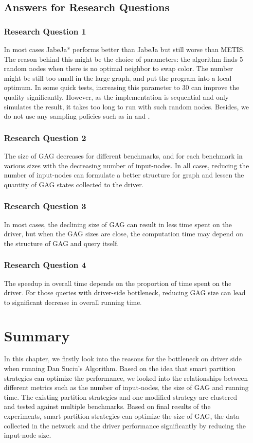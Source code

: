 \subsection{Answers for Research Questions}
\subsubsection{Research Question 1}
In most cases JabeJa* performs better than JabeJa but still worse than METIS. The reason behind this might be the choice of parameters: the algorithm finds 5 random nodes when there is no optimal neighbor to swap color.  The number might be still too small in the large graph, and put the program into a local optimum. In some quick tests, increasing this parameter to 30 can improve the quality significantly. However, as the implementation is sequential and only simulates the result, it takes too long to run with such random nodes.  Besides, we do not use any sampling policies such as in \cite{awan2006distributed} and \cite{dowling2012shuffling}. 
\subsubsection{Research Question 2}
The size of GAG decreases for different benchmarks, and for each benchmark in various sizes with the decreasing number of input-nodes. In all cases, reducing the number of input-nodes can formulate a better structure for graph and lessen the quantity of GAG states collected to the driver.
\subsubsection{Research Question 3}
In most cases, the declining size of GAG can result in less time spent on the driver, but when the GAG sizes are close, the computation time may depend on the structure of GAG and query itself.
\subsubsection{Research Question 4}
The speedup in overall time depends on the proportion of time spent on the driver. For those queries with driver-side bottleneck, reducing GAG size can lead to significant decrease in overall running time.
\section{Summary}
In this chapter, we firstly look into the reasons for the bottleneck on driver side when running Dan Suciu's Algorithm. Based on the idea that smart partition strategies can optimize the performance, we looked into the relationships between different metrics such as the number of input-nodes, the size of GAG and running time. The existing partition strategies and one modified strategy are clustered and tested against multiple benchmarks. Based on final results of the experiments, smart partition-strategies can optimize the size of GAG, the data collected in the network and the driver performance significantly by reducing the input-node size.